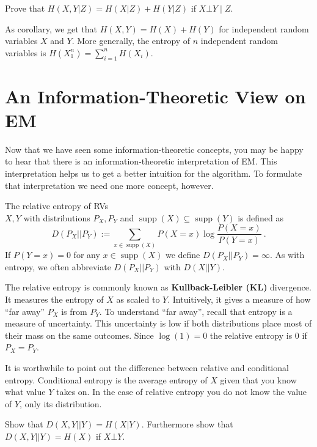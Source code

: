 \documentclass[11pt,leqno,a4paper]{report}\usepackage[]{graphicx}\usepackage[]{color}
\newcommand{\supp}{\operatorname{supp}}
\newcommand{\chris}[1]{ \textcolor{blue}{\textbf{Chris:} #1}}
\begin{document}
\begin{Exercise}
Prove that $ H(X,Y | Z) = H(X | Z) + H(Y | Z) $ if $ X \bot Y \mid Z $.
\end{Exercise}
As corollary, we get that $H(X,Y)=H(X)+H(Y)$ for independent random variables $X$ and $Y$. More generally, the entropy of $n$ independent random variables is $H(X_1^n) = \sum_{i=1}^n H(X_i)$.


\section{An Information-Theoretic View on EM}
Now that we have seen some information-theoretic concepts, you may be happy to hear that there is an information-theoretic interpretation
of EM. This interpretation helps us to get a better intuition for the algorithm. To formulate that interpretation we need
one more concept, however.

\begin{Definition}
The relative entropy of RVs \\ $ X,Y $ with distributions $P_X, P_Y$ and $\supp(X) \subseteq \supp(Y) $ is defined as
$$ D(P_X||P_Y) := \sum_{x \in \supp(X)} P(X=x) \log \frac{P(X=x)}{P(Y=x)} \ . $$
If $ P(Y=x) = 0 $ for any $ x \in \supp(X) $ we define $ D(P_X||P_Y) = \infty $. As with entropy, we often abbreviate $D(P_X||P_Y)$ with  $D(X||Y)$.
\end{Definition}

The relative entropy is commonly known as \textbf{Kullback-Leibler (KL)} divergence. It measures the entropy of $ X $ as scaled to $ Y $. Intuitively,
it gives a measure of how ``far away'' $ P_{X} $ is from $ P_{Y} $. To
understand ``far away'', recall that entropy is a measure of
uncertainty. 
This uncertainty is low if both distributions place most
of their mass on the same outcomes. Since $ \log(1) = 0 $ the relative entropy is 0 if $ P_{X} = P_{Y} $.

It is worthwhile to point out the difference between relative and conditional entropy. Conditional entropy is the average entropy of $ X $ given that you
know what value $ Y $ takes on. In the case of relative entropy you do not know the value of $ Y $, only its distribution.

\begin{Exercise}
Show that $ D(X,Y||Y) = H(X | Y) $. Furthermore show that $ D(X,Y||Y) = H(X) $ if $ X\bot Y $.
\end{Exercise}
\end{document}
